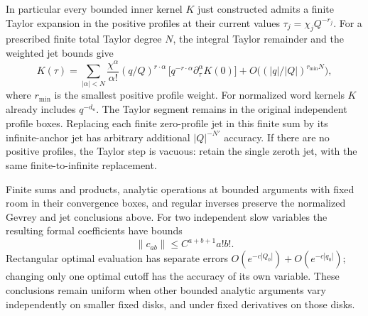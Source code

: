 In particular every bounded inner kernel $K$ just constructed admits a
finite Taylor expansion in the positive profiles at their current values
$\tau_j=\chi_jQ^{-r_j}$.  For a prescribed finite total Taylor degree
$N$, the integral Taylor remainder and the weighted jet bounds give
\begin{equation}\label{eq:additive-positive-Taylor}
 K(\tau)=\sum_{|\alpha|<N}\frac{\chi^\alpha}{\alpha!}
       (q/Q)^{r\cdot\alpha}\,
       \big[q^{-r\cdot\alpha}\partial_\tau^\alpha K(0)\big]
       +O\big((|q|/|Q|)^{r_{\min}N}\big),
\end{equation}
where $r_{\min}$ is the smallest positive profile weight.  For normalized
word kernels $K$ already includes $q^{-d_{\mathbf e}}$.  The Taylor
segment remains in the original independent profile boxes.
Replacing each finite zero-profile jet in this finite sum by its
infinite-anchor jet has arbitrary additional $|Q|^{-N'}$ accuracy.
If there are no positive profiles, the Taylor step is vacuous: retain
the single zeroth jet, with the same finite-to-infinite replacement.

\begin{lemma}\label{lem:additive-gevrey-operations}
Finite sums and products, analytic operations at bounded arguments with
fixed room in their convergence boxes, and regular inverses preserve
the normalized Gevrey and jet conclusions above.  For two independent
slow variables the resulting formal coefficients have bounds
\begin{equation}\label{eq:additive-rectangular}
 \|c_{ab}\|\le C^{a+b+1}a!b!.
\end{equation}
Rectangular optimal evaluation has separate errors
$O(e^{-c|Q_0|})+O(e^{-c|q_0|})$; changing only one optimal cutoff has
the accuracy of its own variable.  These conclusions remain uniform
when other bounded analytic arguments vary independently on smaller
fixed disks, and under fixed derivatives on those disks.
\end{lemma}

